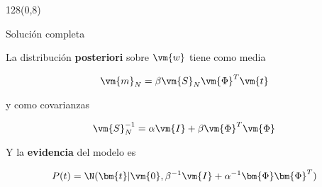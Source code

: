 \documentclass[shownotes]{beamer}
\begin{document}
\begin{frame}
\begin{textblock}{128}(0,8)
\begin{center}
 \normalsize Soluci\'on completa
\end{center}
\end{textblock}
 \vspace{0.75cm}



 La distribuci\'on \textbf{posteriori} sobre $\vm{w}$ tiene como media

\begin{equation}
 \vm{m}_N = \beta  \vm{S}_N\vm{\Phi}^T \vm{t}
\end{equation}

y como covarianzas

\begin{equation}
 \vm{S}_N^{-1} = \alpha \vm{I} + \beta \vm{\Phi}^T\vm{\Phi}
\end{equation}

\pause


Y la \textbf{evidencia} del modelo es

\begin{equation}
 P(t) = \N(\bm{t}| \vm{0}, \beta^{-1} \vm{I} + \alpha^{-1}\bm{\Phi}\bm{\Phi}^T  )
\end{equation}


\end{frame}
\end{document}
